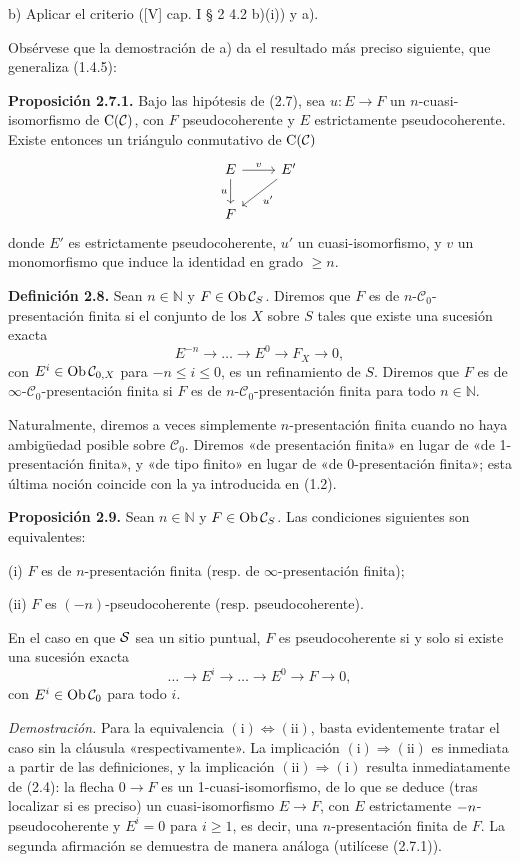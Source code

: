 b) Aplicar el criterio ([V] cap. I § 2 4.2 b)(i)) y a).

Obsérvese que la demostración de a) da el resultado más preciso siguiente, que generaliza (1.4.5):

\textbf{Proposición 2.7.1.} Bajo las hipótesis de (2.7), sea \(u:E\to F\) un \(n\)-cuasi-isomorfismo de \(\Cpx(\mathcal C)\), con \(F\) pseudocoherente y \(E\) estrictamente pseudocoherente. Existe entonces un triángulo conmutativo de \(\Cpx(\mathcal C)\)
\[
\begin{tikzcd}
E \arrow[r,"v"] \arrow[d,"u"'] & E' \arrow[dl,"u'"]\\
F &
\end{tikzcd}
\]
donde \(E'\) es estrictamente pseudocoherente, \(u'\) un cuasi-isomorfismo, y \(v\) un monomorfismo que induce la identidad en grado \(\geq n\).

\textbf{Definición 2.8.} Sean \(n\in\mathbb N\) y \(F\in\Ob\mathcal C_S\). Diremos que \(F\) es de \(n\)-\(\mathcal C_0\)-presentación finita si el conjunto de los \(X\) sobre \(S\) tales que existe una sucesión exacta
\[
  E^{-n}\longrightarrow\ldots\longrightarrow E^0\longrightarrow F_X\longrightarrow 0,
\]
con \(E^i\in\Ob\mathcal C_{0,X}\) para \(-n\leq i\leq 0\), es un refinamiento de \(S\). Diremos que \(F\) es de \(\infty\)-\(\mathcal C_0\)-presentación finita si \(F\) es de \(n\)-\(\mathcal C_0\)-presentación finita para todo \(n\in\mathbb N\).

Naturalmente, diremos a veces simplemente \(n\)-presentación finita cuando no haya ambigüedad posible sobre \(\mathcal C_0\). Diremos «de presentación finita» en lugar de «de 1-presentación finita», y «de tipo finito» en lugar de «de 0-presentación finita»; esta última noción coincide con la ya introducida en (1.2).

\textbf{Proposición 2.9.} Sean \(n\in\mathbb N\) y \(F\in\Ob\mathcal C_S\). Las condiciones siguientes son equivalentes:

(i) \(F\) es de \(n\)-presentación finita (resp. de \(\infty\)-presentación finita);

(ii) \(F\) es \((-n)\)-pseudocoherente (resp. pseudocoherente).

En el caso en que \(\sisi{S}{\mathcal S}\) sea un sitio puntual, \(F\) es pseudocoherente si y solo si existe una sucesión exacta
\[
  \ldots\longrightarrow E^i\longrightarrow\ldots\longrightarrow E^0\longrightarrow F\longrightarrow 0,
\]
con \(E^i\in\Ob\mathcal C_0\) para todo \(i\).

\emph{Demostración.} Para la equivalencia \((\mathrm{i})\Leftrightarrow(\mathrm{ii})\), basta evidentemente tratar el caso sin la cláusula «respectivamente». La implicación \((\mathrm{i})\Rightarrow(\mathrm{ii})\) es inmediata a partir de las definiciones, y la implicación \((\mathrm{ii})\Rightarrow(\mathrm{i})\) resulta inmediatamente de (2.4): la flecha \(0\to F\) es un 1-cuasi-isomorfismo, de lo que se deduce (tras localizar si es preciso) un cuasi-isomorfismo \(E\longrightarrow F\), con \(E\) estrictamente \(\sisi{n}{-n}\)-pseudocoherente y \(E^i=0\) para \(i\geq 1\), es decir, una \(n\)-presentación finita de \(F\). La segunda afirmación se demuestra de manera análoga (utilícese (2.7.1)).

